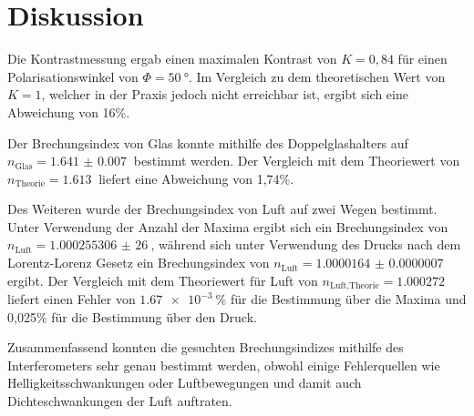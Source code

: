 \section{Diskussion}
\label{sec:Diskussion}
Die Kontrastmessung ergab einen maximalen Kontrast von $K=0,84$ für einen Polarisationswinkel von $\Phi=\SI{50}{\degree}$.
Im Vergleich zu dem theoretischen Wert von $K=1$, welcher in der Praxis jedoch nicht erreichbar ist, ergibt sich eine
Abweichung von 16\%.

Der Brechungsindex von Glas konnte mithilfe des Doppelglashalters auf $n_\text{Glas}=\SI{1.641(7)}{}$ bestimmt werden.
Der Vergleich mit dem Theoriewert von $n_\text{Theorie}=\SI{1,613}{}$ \cite{ns} liefert eine Abweichung von 1,74\%.

Des Weiteren wurde der Brechungsindex von Luft auf zwei Wegen bestimmt. Unter Verwendung der Anzahl der Maxima ergibt
sich ein Brechungsindex von\\
$n_\text{Luft}=\SI{1,000255306(26)}{}$, während sich unter Verwendung des Drucks nach dem
Lorentz-Lorenz Gesetz ein Brechungsindex von $n_\text{Luft}=\SI{1.0000164(7)}{}$ ergibt.
Der Vergleich mit dem Theoriewert für Luft von $n_\text{Luft,Theorie}=\SI{1,000272}{}$ \cite{ns} liefert einen Fehler von
$\SI{1,67e-3}{}$\% für die Bestimmung über die Maxima und 0,025\% für die Bestimmung über den Druck.

Zusammenfassend konnten die gesuchten Brechungsindizes mithilfe des Interferometers sehr genau bestimmt werden, obwohl
einige Fehlerquellen wie Helligkeitsschwankungen oder Luftbewegungen und damit auch Dichteschwankungen der Luft auftraten.
